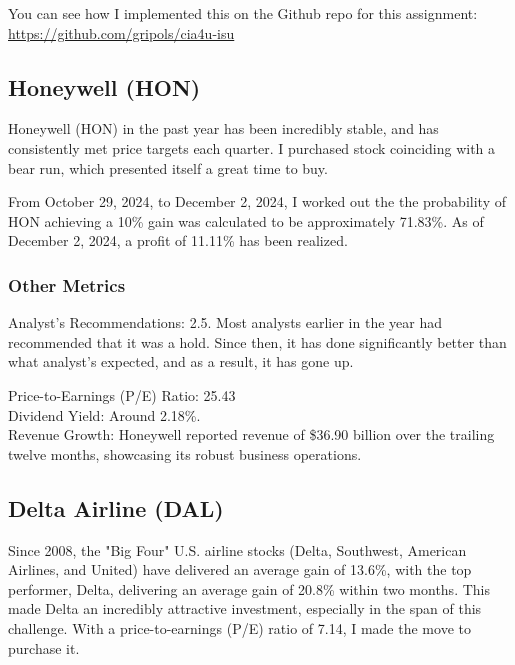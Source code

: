 \documentclass[a4paper, 12pt]{article}
\begin{document}
You can see how I implemented this on the Github repo for this assignment:
\url{https://github.com/gripols/cia4u-isu}


\subsection*{Honeywell (HON)}%
Honeywell (HON) in the past year has been incredibly 
stable, and has consistently met price targets each 
quarter. I purchased stock coinciding with a bear run, 
which presented itself a great time to buy. 

From October 29, 2024, to December 2, 2024, I worked out the the probability of HON achieving a 10\% gain was calculated to be approximately 71.83\%. As of December 2,
2024, a profit of 11.11\% has been realized.

\subsubsection*{Other Metrics}

Analyst's Recommendations: 2.5. Most analysts earlier in the year
had recommended that it was a hold. Since then, it has done significantly
better than what analyst's expected, and as a result, it has gone up.

Price-to-Earnings (P/E) Ratio: 25.43 \\

Dividend Yield: Around 2.18\%. \\

Revenue Growth: Honeywell reported revenue of \$36.90 billion 
over the trailing twelve months, showcasing its robust business operations. \\


\subsection*{Delta Airline (DAL)}%

Since 2008, the "Big Four" U.S. airline stocks (Delta, Southwest, 
American Airlines, and United) have delivered an average gain of 13.6\%, 
with the top performer, Delta, delivering an average gain of 20.8\% within two months.
This made Delta an incredibly attractive investment, especially in the span 
of this challenge. With a price-to-earnings (P/E) ratio of 7.14, 
I made the move to purchase it.\\
\end{document}
